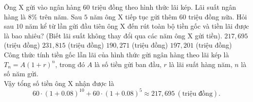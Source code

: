 \begin{ex}%
Ông X gửi vào ngân hàng $60$ triệu đồng theo hình thức lãi kép. Lãi suất ngân hàng là  $8\%$ trên năm. Sau $5$ năm ông X tiếp tục gửi thêm $60$ triệu đồng nữa. Hỏi sau $10$ năm kể từ lần gửi đầu tiên ông X đến rút toàn bộ tiền gốc và tiền lãi được là bao nhiêu? (Biết lãi suất không thay đổi qua các năm ông X gửi tiền).
\choice
{\True $217{,}695$ (triệu đồng)}
{$231{,}815$ (triệu đồng)}
{$190{,}271$ (triệu đồng)}
{$197{,}201$ (triệu đồng)}
\loigiai
{Công thức tính tiền gốc lẫn lãi của hình thức gửi ngân hàng theo lãi kép là $T_n=A(1+r)^n$, trong đó $A$ là số tiền gửi ban đầu, $r$ là lãi suất hàng năm, $n$ là số năm gửi.\\
Vậy tổng số tiền ông X nhận được là $$60\cdot (1+0.08)^{10}+60\cdot (1+0.08)^5\approx 217{,}695\ (\text{triệu đồng}).$$
}
\end{ex}

